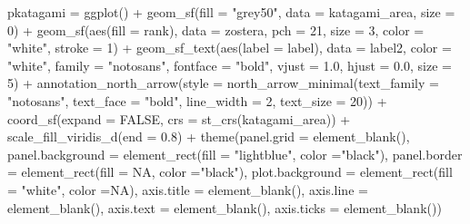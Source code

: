 \documentclass[
]{book}
\newenvironment{Shaded}{\begin{snugshade}}{\end{snugshade}}
\newcommand{\AttributeTok}[1]{\textcolor[rgb]{0.77,0.63,0.00}{#1}}
\newcommand{\ConstantTok}[1]{\textcolor[rgb]{0.00,0.00,0.00}{#1}}
\newcommand{\DecValTok}[1]{\textcolor[rgb]{0.00,0.00,0.81}{#1}}
\newcommand{\FloatTok}[1]{\textcolor[rgb]{0.00,0.00,0.81}{#1}}
\newcommand{\FunctionTok}[1]{\textcolor[rgb]{0.00,0.00,0.00}{#1}}
\newcommand{\NormalTok}[1]{#1}
\newcommand{\OtherTok}[1]{\textcolor[rgb]{0.56,0.35,0.01}{#1}}
\newcommand{\SpecialCharTok}[1]{\textcolor[rgb]{0.00,0.00,0.00}{#1}}
\newcommand{\StringTok}[1]{\textcolor[rgb]{0.31,0.60,0.02}{#1}}
\theoremstyle{definition}
\theoremstyle{definition}
\theoremstyle{definition}
\theoremstyle{definition}
\theoremstyle{remark}
\begin{document}
\begin{Shaded}
\begin{Highlighting}[]
\NormalTok{pkatagami }\OtherTok{=} \FunctionTok{ggplot}\NormalTok{() }\SpecialCharTok{+}
  \FunctionTok{geom\_sf}\NormalTok{(}\AttributeTok{fill =} \StringTok{"grey50"}\NormalTok{, }\AttributeTok{data =}\NormalTok{ katagami\_area, }\AttributeTok{size =} \DecValTok{0}\NormalTok{) }\SpecialCharTok{+}
  \FunctionTok{geom\_sf}\NormalTok{(}\FunctionTok{aes}\NormalTok{(}\AttributeTok{fill =}\NormalTok{ rank), }\AttributeTok{data =}\NormalTok{ zostera,}
          \AttributeTok{pch =} \DecValTok{21}\NormalTok{, }\AttributeTok{size =} \DecValTok{3}\NormalTok{,}
          \AttributeTok{color =} \StringTok{"white"}\NormalTok{, }\AttributeTok{stroke =} \DecValTok{1}\NormalTok{) }\SpecialCharTok{+}
  \FunctionTok{geom\_sf\_text}\NormalTok{(}\FunctionTok{aes}\NormalTok{(}\AttributeTok{label =}\NormalTok{ label), }
               \AttributeTok{data =}\NormalTok{ label2,}
               \AttributeTok{color =} \StringTok{"white"}\NormalTok{,}
               \AttributeTok{family =} \StringTok{"notosans"}\NormalTok{, }
               \AttributeTok{fontface =} \StringTok{"bold"}\NormalTok{,}
               \AttributeTok{vjust =} \FloatTok{1.0}\NormalTok{, }\AttributeTok{hjust =} \FloatTok{0.0}\NormalTok{,}
               \AttributeTok{size =} \DecValTok{5}\NormalTok{)  }\SpecialCharTok{+} 
  \FunctionTok{annotation\_north\_arrow}\NormalTok{(}\AttributeTok{style =} \FunctionTok{north\_arrow\_minimal}\NormalTok{(}\AttributeTok{text\_family =} \StringTok{"notosans"}\NormalTok{, }
                                                     \AttributeTok{text\_face =} \StringTok{"bold"}\NormalTok{,}
                                                     \AttributeTok{line\_width =} \DecValTok{2}\NormalTok{,}
                                                     \AttributeTok{text\_size =} \DecValTok{20}\NormalTok{)) }\SpecialCharTok{+} 
  \FunctionTok{coord\_sf}\NormalTok{(}\AttributeTok{expand =} \ConstantTok{FALSE}\NormalTok{, }\AttributeTok{crs =} \FunctionTok{st\_crs}\NormalTok{(katagami\_area)) }\SpecialCharTok{+}
  \FunctionTok{scale\_fill\_viridis\_d}\NormalTok{(}\AttributeTok{end =} \FloatTok{0.8}\NormalTok{) }\SpecialCharTok{+}
  \FunctionTok{theme}\NormalTok{(}\AttributeTok{panel.grid =} \FunctionTok{element\_blank}\NormalTok{(),}
        \AttributeTok{panel.background =} \FunctionTok{element\_rect}\NormalTok{(}\AttributeTok{fill =} \StringTok{"lightblue"}\NormalTok{, }\AttributeTok{color =}\StringTok{"black"}\NormalTok{),}
        \AttributeTok{panel.border  =} \FunctionTok{element\_rect}\NormalTok{(}\AttributeTok{fill =} \ConstantTok{NA}\NormalTok{, }\AttributeTok{color =}\StringTok{"black"}\NormalTok{),}
        \AttributeTok{plot.background =}  \FunctionTok{element\_rect}\NormalTok{(}\AttributeTok{fill =} \StringTok{"white"}\NormalTok{, }\AttributeTok{color =}\ConstantTok{NA}\NormalTok{),}
        \AttributeTok{axis.title =} \FunctionTok{element\_blank}\NormalTok{(),}
        \AttributeTok{axis.line =} \FunctionTok{element\_blank}\NormalTok{(),}
        \AttributeTok{axis.text =} \FunctionTok{element\_blank}\NormalTok{(),}
        \AttributeTok{axis.ticks =} \FunctionTok{element\_blank}\NormalTok{())}
\end{Highlighting}
\end{Shaded}
\end{document}
